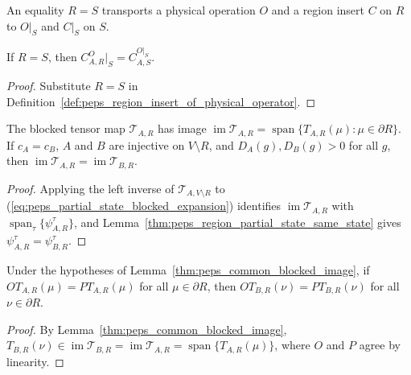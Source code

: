 \begin{definition}%
    \label{def:peps_region_identification}
    \leanok
    An equality $R=S$ transports a physical operation $O$ and a region insert
    $C$ on $R$ to $O|_S$ and $C|_S$ on $S$.
\end{definition}

\begin{lemma}%
    \label{thm:peps_realization_identification}
    \leanok
    If $R=S$, then $C^O_{A,R}|_S=C^{O|_S}_{A,S}$.
\end{lemma}
\begin{proof}
    \leanok
    Substitute $R=S$ in Definition~\ref{def:peps_region_insert_of_physical_operator}.
\end{proof}

\begin{lemma}%
    \label{thm:peps_common_blocked_image}
    \leanok
    The blocked tensor map $\mathcal T_{A,R}$ has image
    $\operatorname{im}\mathcal T_{A,R}=\operatorname{span}\{T_{A,R}(\mu):\mu\in\partial R\}$.
    If $c_A=c_B$, $A$ and $B$ are injective on $V\setminus R$, and
    $D_A(g),D_B(g)>0$ for all $g$, then
    $\operatorname{im}\mathcal T_{A,R}=\operatorname{im}\mathcal T_{B,R}$.
\end{lemma}
\begin{proof}
    \leanok
    Applying the left inverse of $\mathcal T_{A,V\setminus R}$ to
    (\ref{eq:peps_partial_state_blocked_expansion}) identifies
    $\operatorname{im}\mathcal T_{A,R}$ with $\operatorname{span}_\tau\{\psi^\tau_{A,R}\}$,
    and Lemma~\ref{thm:peps_region_partial_state_same_state} gives
    $\psi^\tau_{A,R}=\psi^\tau_{B,R}$.
\end{proof}

\begin{lemma}%
    \label{thm:peps_physical_operations_common_image}
    \leanok
    Under the hypotheses of Lemma~\ref{thm:peps_common_blocked_image}, if
    $OT_{A,R}(\mu)=PT_{A,R}(\mu)$ for all $\mu\in\partial R$, then
    $OT_{B,R}(\nu)=PT_{B,R}(\nu)$ for all $\nu\in\partial R$.
\end{lemma}
\begin{proof}
    \leanok
    By Lemma~\ref{thm:peps_common_blocked_image},
    $T_{B,R}(\nu)\in\operatorname{im}\mathcal T_{B,R}=\operatorname{im}\mathcal T_{A,R}=\operatorname{span}\{T_{A,R}(\mu)\}$,
    where $O$ and $P$ agree by linearity.
\end{proof}

